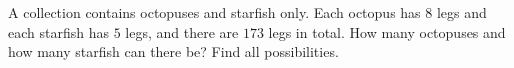 A collection contains octopuses and starfish only. Each octopus has $8$ legs and each starfish has $5$ legs, and there are $173$ legs in total. How many octopuses and how many starfish can there be? Find all possibilities.
